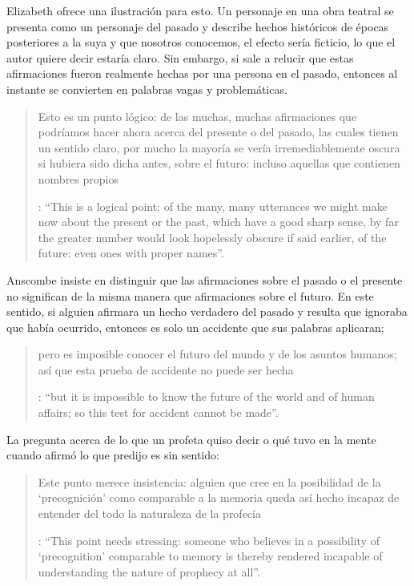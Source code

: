 Elizabeth ofrece una ilustración para esto. Un personaje en una obra teatral se presenta como un personaje del pasado y describe hechos históricos de épocas posteriores a la suya y que nosotros conocemos, el efecto sería ficticio, lo que el autor quiere decir estaría claro. Sin embargo, si sale a relucir que estas afirmaciones fueron realmente hechas por una persona en el pasado, entonces al instante se convierten en palabras vagas y problemáticas. \blockquote[{\Cite[31]{anscombe2008faith:prophandmi}}: \enquote{This is a logical point: of the many, many utterances we might make now about the present or the past, which have a good sharp sense, by far the greater number would look hopelessly obscure if said earlier, of the future: even ones with proper names}.]{Esto es un punto lógico: de las muchas, muchas afirmaciones que podríamos hacer ahora acerca del presente o del pasado, las cuales tienen un sentido claro, por mucho la mayoría se vería irremediablemente oscura si hubiera sido dicha antes, sobre el futuro: incluso aquellas que contienen nombres propios} Anscombe insiste en distinguir que las afirmaciones sobre el pasado o el presente no significan de la misma manera que afirmaciones sobre el futuro. En este sentido, si alguien afirmara un hecho verdadero del pasado y resulta que ignoraba que había ocurrido, entonces es solo un accidente que sus palabras aplicaran; \blockquote[{\Cite[29]{anscombe2008faith:prophandmi}}: \enquote{but it is impossible to know the future of the world and of human affairs; so this test for accident cannot be made}.]{pero es imposible conocer el futuro del mundo y de los asuntos humanos; así que esta prueba de accidente no puede ser hecha}. La pregunta acerca de lo que un profeta quiso decir o qué tuvo en la mente cuando afirmó lo que predijo es sin sentido: \blockquote[{\Cite[29]{anscombe2008faith:prophandmi}}: \enquote{This point needs stressing: someone who believes in a possibility of `precognition' comparable to memory is thereby rendered incapable of understanding the nature of prophecy at all}.]{Este punto merece insistencia: alguien que cree en la posibilidad de la `precognición' como comparable a la memoria queda así hecho incapaz de entender del todo la naturaleza de la profecía}.

